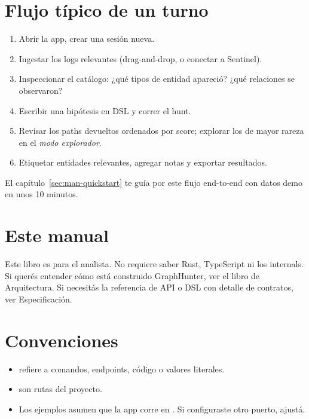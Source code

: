 \section{Flujo típico de un turno}

\begin{enumerate}
    \item Abrir la app, crear una sesión nueva.
    \item Ingestar los logs relevantes (drag-and-drop, o conectar a
    Sentinel).
    \item Inspeccionar el catálogo: ¿qué tipos de entidad apareció?
    ¿qué relaciones se observaron?
    \item Escribir una hipótesis en DSL y correr el hunt.
    \item Revisar los paths devueltos ordenados por score;
    explorar los de mayor rareza en el \emph{modo explorador}.
    \item Etiquetar entidades relevantes, agregar notas y exportar
    resultados.
\end{enumerate}

El capítulo~\ref{sec:man-quickstart} te guía por este flujo
end-to-end con datos demo en unos 10 minutos.

\section{Este manual}

Este libro es para el analista. No requiere saber Rust, TypeScript
ni los internals. Si querés entender cómo está construido
GraphHunter, ver el libro de Arquitectura. Si necesitás la
referencia de API o DSL con detalle de contratos, ver
Especificación.

\section{Convenciones}

\begin{itemize}
    \item {} refiere a comandos, endpoints,
    código o valores literales.
    \item {} son rutas del proyecto.
    \item Los ejemplos asumen que la app corre en
    . Si configuraste otro puerto, ajustá.
\end{itemize}
